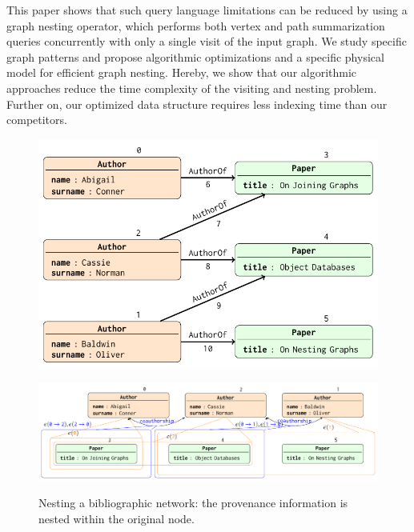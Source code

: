 This paper shows that such query language limitations can be reduced by using a graph nesting operator, which performs both vertex and path summarization queries concurrently with only a single visit of the input graph. %
We study specific graph patterns and propose algorithmic optimizations and a specific physical model for efficient graph nesting. Hereby, we show that our algorithmic approaches reduce the time complexity of the visiting and nesting problem. Further on, our optimized data structure requires less indexing time than our competitors.

\begin{figure}[!t]
	\begin{minipage}[!t]{0.5\textwidth}
		\centering
		\includegraphics[width=.8\textwidth]{images/nesting/patterns/04bibliography}
		\label{fig:inputbibex2}
	\end{minipage}
	\medskip
	
	\begin{minipage}[!t]{0.5\textwidth}
		\centering
		\includegraphics[width=\textwidth]{images/nesting/patterns/042nested}
		\label{fig:outputnested}
	\end{minipage}
	\caption{Nesting a bibliographic network: the provenance information is nested within the original node. }
	\label{fig:bibex2}
\end{figure}


